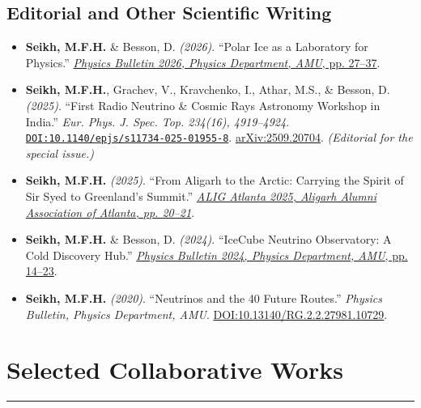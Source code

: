 \documentclass[10pt]{article}
\newcommand{\doi}[1]{{\urlstyle{tt}\href{https://doi.org/#1}{\nolinkurl{DOI:#1}}}.}
\newcommand{\arxiv}[1]{\href{https://arxiv.org/abs/#1}{arXiv:#1}.}
\begin{document}
\subsection{Editorial and Other Scientific Writing}
\begin{itemize}
    \item \textbf{Seikh, M.F.H.} \& Besson, D. \textit{(2026)}. ``Polar Ice as a Laboratory for Physics.'' \href{https://drive.google.com/file/d/1eny09TjrDmNsoqKf86RbFbMdMi_LdEsB/view?usp=share_link}{\textit{Physics Bulletin 2026, Physics Department, AMU}, pp. 27--37}.
    \item \textbf{Seikh, M.F.H.}, Grachev, V., Kravchenko, I., Athar, M.S., \& Besson, D. \textit{(2025)}. ``First Radio Neutrino \& Cosmic Rays Astronomy Workshop in India.'' \textit{Eur. Phys. J. Spec. Top. 234(16), 4919--4924}. \doi{10.1140/epjs/s11734-025-01955-8} \arxiv{2509.20704} \textit{(Editorial for the special issue.)}
    \item \textbf{Seikh, M.F.H.} \textit{(2025)}. ``From Aligarh to the Arctic: Carrying the Spirit of Sir Syed to Greenland's Summit.'' \href{https://www.amuatl.org/publications/1}{\textit{ALIG Atlanta 2025, Aligarh Alumni Association of Atlanta, pp. 20--21}}.
    \item \textbf{Seikh, M.F.H.} \& Besson, D. \textit{(2024)}. ``IceCube Neutrino Observatory: A Cold Discovery Hub.'' \href{https://drive.google.com/file/d/1q1vm4tf2Z8iK_Iw3n3kVayBnP7K6tHQI/view?usp=sharing}{\textit{Physics Bulletin 2024, Physics Department, AMU}, pp. 14--23}.
    \item \textbf{Seikh, M.F.H.} \textit{(2020)}. ``Neutrinos and the 40 Future Routes.'' \textit{Physics Bulletin, Physics Department, AMU}. \href{https://www.researchgate.net/publication/340272190_Neutrinos_and_the_40_Future_Routes}{DOI:10.13140/RG.2.2.27981.10729}.
\end{itemize}

\clearpage
\section{Selected Collaborative Works}
\vspace{3pt}
\hrule
\vspace{4pt}
\end{document}

